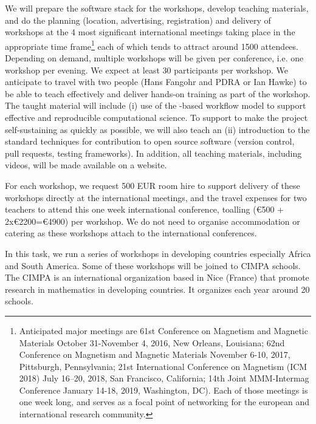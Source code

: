 \begin{workpackage}
\begin{tasklist}
\begin{task}[title=\OOMMFNB{} open source dissemination workshops,
id=dissemination-of-oommf-nb-workshops,lead=USO,PM=6]
  We will prepare the software stack for the workshops, develop
  teaching materials, and do the planning (location, advertising,
  registration) and delivery of workshops at the 4 most significant
  international meetings taking place in the appropriate time
  frame\footnote{Anticipated major meetings are 61st Conference on
    Magnetism and Magnetic Materials October 31-November 4, 2016, New
    Orleans, Louisiana; 62nd Conference on Magnetism and Magnetic
    Materials November 6-10, 2017, Pittsburgh, Pennsylvania; 21st
    International Conference on Magnetism (ICM 2018) July 16–20, 2018,
    San Francisco, California; 14th Joint MMM-Intermag Conference
    January 14-18, 2019, Washington, DC). Each of those meetings is
    one week long, and serves as a focal point of networking for the
    european and international research community.} each of which
  tends to attract around 1500 attendees. Depending on demand,
  multiple workshops will be given per conference, i.e. one workshop
  per evening. We expect at least 30 participants per workshop. We
  anticipate to travel with two people (Hans Fangohr and PDRA or Ian
  Hawke) to be able to teach effectively and deliver hands-on training
  as part of the workshop. The taught material will include (i) use of
  the \Jupyter-based \OOMMFNB{} workflow model to support effective and reproducible
  computational science.  To support to make the \OOMMFNB{} project
  self-sustaining as quickly as possible,
  we will also teach an (ii) introduction to the standard techniques
  for contribution to open source software (version control, pull
  requests, testing frameworks).  In addition, all teaching materials,
  including videos, will be made available on a website.

  For each workshop, we request 500 EUR room hire to support delivery of
  these workshops directly at the international meetings, and the
  travel expenses for two teachers to attend this one week
  international conference, toalling (\euro{500} + 2x\euro{2200}=\euro{4900}) per
  workshop. We do not need to organise accommodation or catering as
  these workshops attach to the international conferences.
\end{task}

\begin{task}[title=workshops in developing countries]
In this task, we run a series of workshops in developing countries especially
Africa and South America. Some of these workshops will be joined to CIMPA schools.
The CIMPA is an international organization based in Nice (France) that promote
research in mathematics in developing countries. It organizes each year around
20 schools.


\end{task}
\end{tasklist}
\end{workpackage}
